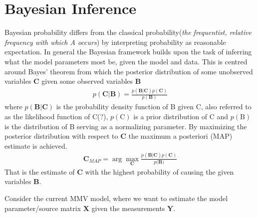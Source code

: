 \section{Bayesian Inference}
Bayesian probability differs from the classical probability(\textit{the frequentist, relative
frequency with which A occurs}) by interpreting probability as reasonable expectation. 
In general the Bayesian framework builds upon the task of inferring what the model parameters most be, given the model and data.  
This is centred around Bayes' theorem from which the posterior distribution of some unobserved variables $\textbf{C}$ given some observed variables $\textbf{B}$
\begin{align*}
p(\textbf{C}|\textbf{B})=\frac{p(\textbf{B}|\textbf{C})p(\textbf{C})}{p(\textbf{B})}
\end{align*}  
where $p(\textbf{B}|\textbf{C})$ is the probability density function of $\text{B}$ given $\text{C}$, also referred to as the likelihood function of $\text{C}$(?), $p(\text{C})$ is a prior distribution of $\text{C}$ and $p(\text{B})$ is the distribution of $\text{B}$ serving as a normalizing parameter.  
By maximizing the posterior distribution with respect to $\textbf{C}$ the maximum a posteriori (MAP) estimate is achieved. 
\begin{align*}
\textbf{C}_{MAP} = \arg \max_{\mathbf{C}} \frac{p(\mathbf{B} \vert \mathbf{C}) p(\mathbf{C})}{p(\mathbf{B)}}
\end{align*}
That is the estimate of $\textbf{C}$ with the highest probability of causing the given variables $\textbf{B}$. 

Consider the current MMV model, where we want to estimate the model parameter/source matrix $\textbf{X}$ given the measurements $\textbf{Y}$.   
  

